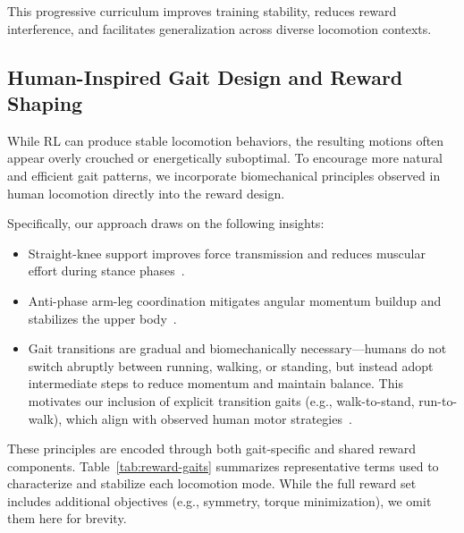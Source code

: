 \documentclass[letterpaper, 10 pt, conference]{ieeeconf}
\begin{document}
This progressive curriculum improves training stability, reduces reward interference, and facilitates generalization across diverse locomotion contexts.











\subsection{Human-Inspired Gait Design and Reward Shaping}

While RL can produce stable locomotion behaviors, the resulting motions often appear overly crouched or energetically suboptimal. To encourage more natural and efficient gait patterns, we incorporate biomechanical principles observed in human locomotion directly into the reward design.

Specifically, our approach draws on the following insights:
\begin{itemize}
    \item Straight-knee support improves force transmission and reduces muscular effort during stance phases~\cite{zajac2002biomechanics}.
    
    \item Anti-phase arm-leg coordination mitigates angular momentum buildup and stabilizes the upper body~\cite{collins2009dynamic, pontzer2009control}.
    
    \item Gait transitions are gradual and biomechanically necessary—humans do not switch abruptly between running, walking, or standing, but instead adopt intermediate steps to reduce momentum and maintain balance. This motivates our inclusion of explicit transition gaits (e.g., walk-to-stand, run-to-walk), which align with observed human motor strategies~\cite{minetti2000transition, hubel2013transition}.
\end{itemize}

These principles are encoded through both gait-specific and shared reward components. Table~\ref{tab:reward-gaits} summarizes representative terms used to characterize and stabilize each locomotion mode. While the full reward set includes additional objectives (e.g., symmetry, torque minimization), we omit them here for brevity.
\end{document}
